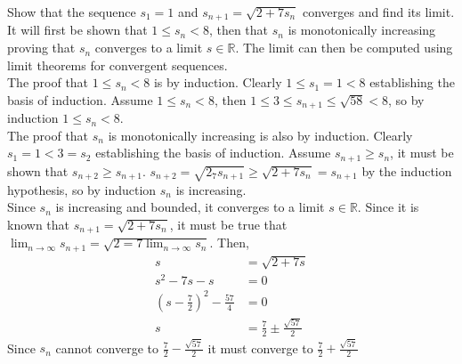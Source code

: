 \documentclass{article}
\begin{document}
\begin{Probem}
Show that the sequence $s_1=1$ and $s_{n+1}=\sqrt{2+7s_n}$ converges and find its limit. \\
It will first be shown that $1\leq s_n<8$, then that $s_n$ is monotonically increasing proving that $s_n$ converges to a limit $s\in\mathbb{R}$.  The limit can then be computed using limit theorems for convergent sequences.\\
The proof that $1\leq s_n<8$ is by induction.  Clearly $1\leq s_1=1<8$ establishing the basis of induction.  Assume $1\leq s_n<8$, then $1\leq 3\leq s_{n+1}\leq\sqrt{58}<8$, so by induction $1\leq s_n<8$. \\
The proof that $s_n$ is monotonically increasing is also by induction.  Clearly $s_1=1<3=s_2$ establishing the basis of induction.  Assume $s_{n+1}\geq s_n$, it must be shown that $s_{n+2}\geq s_{n+1}$.  $s_{n+2}=\sqrt{2_7s_{n+1}}\geq\sqrt{2+7s_n}=s_{n+1}$ by the induction hypothesis, so by induction $s_n$ is increasing. \\
Since $s_n$ is increasing and bounded, it converges to a limit $s\in\mathbb{R}$.  Since it is known that $s_{n+1}=\sqrt{2+7s_n}$, it must be true that $\lim_{n\to\infty}s_{n+1}=\sqrt{2=7\lim_{n\to\infty}s_n}$.  Then,
\begin{align*}
    s&=\sqrt{2+7s} \\
    s^2-7s-s&=0 \\
    (s-\frac{7}{2})^2-\frac{57}{4}&=0 \\
    s&=\frac{7}{2}\pm \frac{\sqrt{57}}{2}
\end{align*}
Since $s_n$ cannot converge to $\frac{7}{2}-\frac{\sqrt{57}}{2}$ it must converge to $\frac{7}{2}+\frac{\sqrt{57}}{2}$
\end{Probem}
\end{document}
